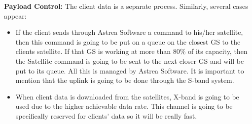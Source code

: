 \textbf{Payload Control:}  The client data is a separate process. Similarly, several cases appear:

\begin{itemize}
\item If the client sends through Astrea Software a command to his/her satellite, then this command is going to be put on a queue on the closest GS to the clients satellite. If that GS is working at more than 80\% of its capacity, then the Satellite command is going to be sent to the next closer GS and will be put to its queue. All this is managed by Astrea Software. It is important to mention that the uplink is going to be done through the S-band system. 
\item When client data is downloaded from the satellites, X-band is going to be used due to the higher achievable data rate. This channel is going to be specifically reserved for clients’ data so it will be really fast.
\end{itemize}